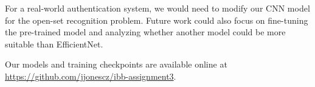 \documentclass[9pt]{IEEEtran}
\begin{document}
For a real-world authentication system, we would need to modify our CNN model for the open-set recognition problem.
Future work could also focus on fine-tuning the pre-trained model and analyzing whether another model could be more suitable than EfficientNet.

Our models and training checkpoints are available online at \url{https://github.com/jjonescz/ibb-assignment3}.



\end{document}
